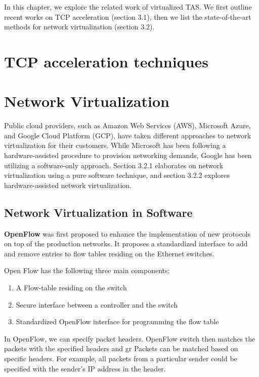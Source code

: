  In this chapter, we explore the related work of virtualized TAS. We first outline recent 
 works on TCP acceleration (section 3.1), then we list the state-of-the-art methods for network virtualization (section 3.2).



\section{TCP acceleration techniques}


\section{Network Virtualization}
Public cloud providers, such as Amazon Web Services (AWS), Microsoft Azure, and Google Cloud Platform (GCP), have taken different approaches to network virtualization for their customers. While Microsoft has been following a hardware-assisted procedure to provision networking demands, Google has been 
utilizing a software-only approach. Section 3.2.1 elaborates on network 
virtualization using a pure software technique, and section 3.2.2 explores hardware-assisted network virtualization.


\subsection{Network Virtualization in Software}
\textbf{OpenFlow} was first proposed to enhance the implementation of new protocols
on top of the production networks. It proposes a standardized interface to add and
remove entries to flow tables residing on the Ethernet switches.\cite{mckeown2008openflow}


Open Flow has the following three main components:
\begin{enumerate}
    \item A Flow-table residing on the switch
    \item Secure interface between a controller and the switch
    \item Standardized OpenFlow interface for programming the flow table
\end{enumerate}



In OpenFlow, we can specify packet headers. OpenFlow switch then matches the 
packets with the specified headers and gr
Packets can be matched based on specific headers. For example, all packets from
a particular sender could be specified with the sender's IP address in the header. 

